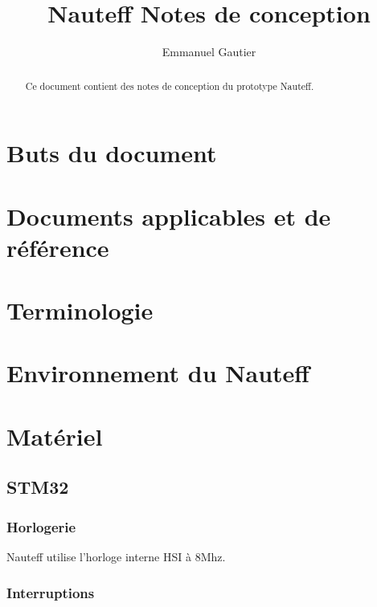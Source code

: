 \documentclass[a4paper,11pt]{report}
\title{Nauteff Notes de conception}
\author{Emmanuel Gautier}
\begin{document}
\maketitle

\begin{abstract}
Ce document contient des notes de conception du prototype Nauteff.
\end{abstract}

\tableofcontents
\chapter{Buts du document}
\chapter{Documents applicables et de référence}
\chapter{Terminologie}
\chapter{Environnement du Nauteff}
\chapter{Matériel}
\section{STM32}
\subsection{Horlogerie}
Nauteff utilise l'horloge interne HSI à 8Mhz.

\subsection{Interruptions}
\end{document}
